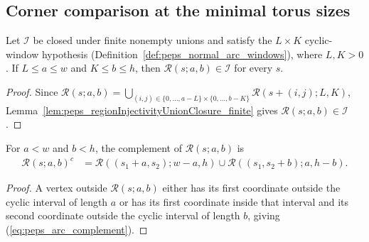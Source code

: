\subsection{Corner comparison at the minimal torus sizes}
\label{subsec:peps_window_scalar_comparison}

\begin{lemma}%
    \label{thm:peps_arc_rectangle_injective}
    \leanok
    Let $\mathcal I$ be closed under finite nonempty unions and satisfy the
    $L\times K$ cyclic-window hypothesis (Definition~\ref{def:peps_normal_arc_windows}),
    where $L,K>0$. If $L\le a\le w$ and $K\le b\le h$, then
    $\mathcal R(s;a,b)\in\mathcal I$ for every $s$.
\end{lemma}
\begin{proof}\leanok
    Since $\mathcal R(s;a,b)=\bigcup_{(i,j)\in\{0,\ldots,a-L\}\times\{0,\ldots,b-K\}}\mathcal R(s+(i,j);L,K)$,
    Lemma~\ref{lem:peps_regionInjectivityUnionClosure_finite} gives
    $\mathcal R(s;a,b)\in\mathcal I$.
\end{proof}

\begin{lemma}%
    \label{thm:peps_arc_rectangle_complement}
    \leanok
    For $a<w$ and $b<h$, the complement of $\mathcal R(s;a,b)$ is
    \begin{align}
        \mathcal R(s;a,b)^c
         & =\mathcal R((s_1+a,s_2);w-a,h)
        \cup\mathcal R((s_1,s_2+b);a,h-b).
        \label{eq:peps_arc_complement}
    \end{align}
\end{lemma}
\begin{proof}\leanok
    A vertex outside $\mathcal R(s;a,b)$ either has its first coordinate outside
    the cyclic interval of length $a$ or has its first coordinate inside that
    interval and its second coordinate outside the cyclic interval of length $b$,
    giving (\ref{eq:peps_arc_complement}).
\end{proof}

